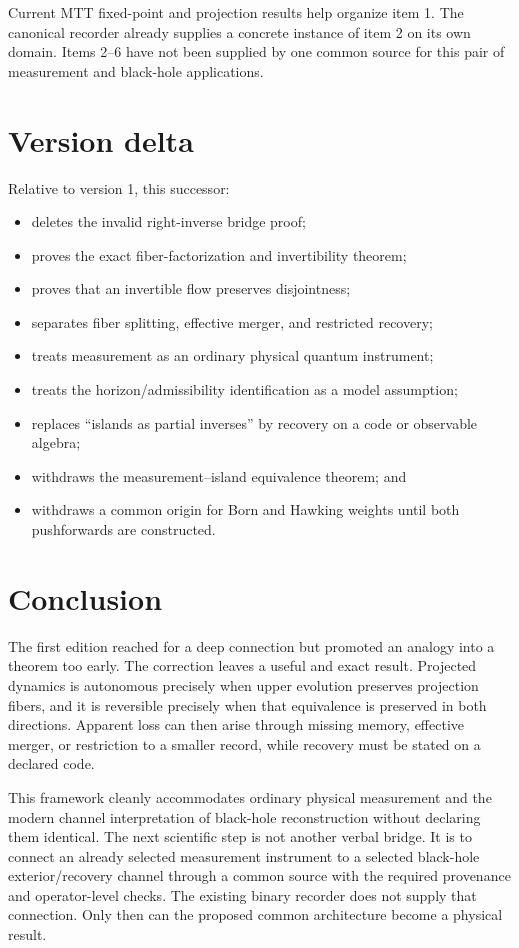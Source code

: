 \documentclass[11pt]{article}
\begin{document}
Current MTT fixed-point and projection results help organize item 1. The
canonical recorder already supplies a concrete instance of item 2 on its own
domain. Items 2--6 have not been supplied by one common source for this pair
of measurement and black-hole applications.

\section{Version delta}

Relative to version 1, this successor:
\begin{itemize}
\item deletes the invalid right-inverse bridge proof;
\item proves the exact fiber-factorization and invertibility theorem;
\item proves that an invertible flow preserves disjointness;
\item separates fiber splitting, effective merger, and restricted recovery;
\item treats measurement as an ordinary physical quantum instrument;
\item treats the horizon/admissibility identification as a model assumption;
\item replaces ``islands as partial inverses'' by recovery on a code or
observable algebra;
\item withdraws the measurement--island equivalence theorem; and
\item withdraws a common origin for Born and Hawking weights until both
pushforwards are constructed.
\end{itemize}

\section{Conclusion}

The first edition reached for a deep connection but promoted an analogy into
a theorem too early. The correction leaves a useful and exact result.
Projected dynamics is autonomous precisely when upper evolution preserves
projection fibers, and it is reversible precisely when that equivalence is
preserved in both directions. Apparent loss can then arise through missing
memory, effective merger, or restriction to a smaller record, while recovery
must be stated on a declared code.

This framework cleanly accommodates ordinary physical measurement and the
modern channel interpretation of black-hole reconstruction without declaring
them identical. The next scientific step is not another verbal bridge. It is
to connect an already selected measurement instrument to a selected
black-hole exterior/recovery channel through a common source with the
required provenance and operator-level checks. The existing binary recorder
does not supply that connection. Only then can the proposed common
architecture become a physical result.
\end{document}
